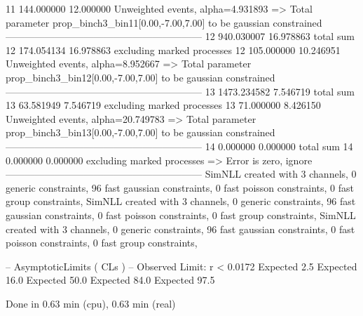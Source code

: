 11         144.000000      12.000000       Unweighted events, alpha=4.931893
  => Total parameter prop_binch3_bin11[0.00,-7.00,7.00] to be gaussian constrained
------------------------------------------------------------
12         940.030007      16.978863       total sum                     
12         174.054134      16.978863       excluding marked processes    
12         105.000000      10.246951       Unweighted events, alpha=8.952667
  => Total parameter prop_binch3_bin12[0.00,-7.00,7.00] to be gaussian constrained
------------------------------------------------------------
13         1473.234582     7.546719        total sum                     
13         63.581949       7.546719        excluding marked processes    
13         71.000000       8.426150        Unweighted events, alpha=20.749783
  => Total parameter prop_binch3_bin13[0.00,-7.00,7.00] to be gaussian constrained
------------------------------------------------------------
14         0.000000        0.000000        total sum                     
14         0.000000        0.000000        excluding marked processes    
  => Error is zero, ignore      
------------------------------------------------------------
SimNLL created with 3 channels, 0 generic constraints, 96 fast gaussian constraints, 0 fast poisson constraints, 0 fast group constraints, 
SimNLL created with 3 channels, 0 generic constraints, 96 fast gaussian constraints, 0 fast poisson constraints, 0 fast group constraints, 
SimNLL created with 3 channels, 0 generic constraints, 96 fast gaussian constraints, 0 fast poisson constraints, 0 fast group constraints, 

 -- AsymptoticLimits ( CLs ) --
Observed Limit: r < 0.0172
Expected  2.5%
Expected 16.0%
Expected 50.0%
Expected 84.0%
Expected 97.5%

Done in 0.63 min (cpu), 0.63 min (real)
